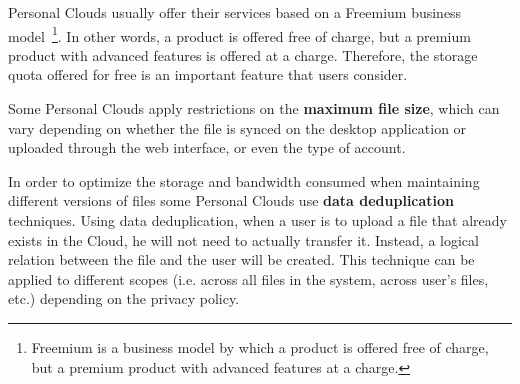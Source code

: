 Personal Clouds usually offer their services based on a Freemium business model~\footnote{Freemium is a business model by which a product is offered free of charge, but a premium product with advanced features at a charge.}. In other words, a product is offered free of charge, but a premium product with advanced features is offered at a charge. Therefore, the storage quota offered for free is an important feature that users consider.

Some Personal Clouds apply restrictions on the \textbf{maximum file size}, which can vary depending on whether the file is synced on the desktop application or uploaded through the web interface, or even the type of account.

In order to optimize the storage and bandwidth consumed when maintaining different versions of files some Personal Clouds use \textbf{data deduplication} techniques. Using data deduplication, when a user is to upload a file that already exists in the Cloud, he will not need to actually transfer it. Instead, a logical relation between the file and the user will be created. This technique can be applied to different scopes (i.e. across all files in the system, across user's files, etc.) depending on the privacy policy.

